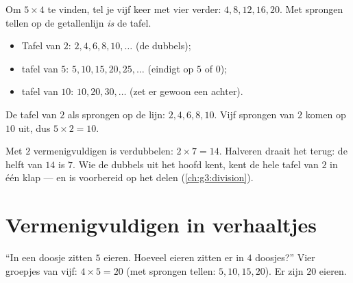 \begin{method}\label{met:g2:mult:skip}
Om $5 \times 4$ te vinden, tel je vijf keer met vier verder:
$4, 8, 12, 16, 20$. Met sprongen tellen op de getallenlijn \emph{is} de
tafel.
\begin{itemize}
  \item Tafel van $2$: $2, 4, 6, 8, 10, \dots$ (de dubbels);
  \item tafel van $5$: $5, 10, 15, 20, 25, \dots$ (eindigt op $5$ of
        $0$);
  \item tafel van $10$: $10, 20, 30, \dots$ (zet er gewoon een 
        achter).
\end{itemize}
\end{method}

\begin{omfigure}

{\small De tafel van $2$ als sprongen op de lijn: $2, 4, 6, 8, 10$.
Vijf sprongen van $2$ komen op $10$ uit, dus $5 \times 2 = 10$.}
\end{omfigure}

\begin{example}\label{ex:g2:mult:double}
Met $2$ vermenigvuldigen is verdubbelen: $2 \times 7 = 14$. Halveren
draait het terug: de helft van $14$ is $7$. Wie de dubbels uit het hoofd
kent, kent de hele tafel van $2$ in één klap --- en is voorbereid op het
delen (\cref{ch:g3:division}).
\end{example}

\section{Vermenigvuldigen in verhaaltjes}

\begin{example}\label{ex:g2:mult:problem}
``In een doosje zitten $5$ eieren. Hoeveel eieren zitten er in $4$
doosjes?'' Vier groepjes van vijf: $4 \times 5 = 20$ (met sprongen
tellen: $5, 10, 15, 20$). Er zijn $20$ eieren.
\end{example}

